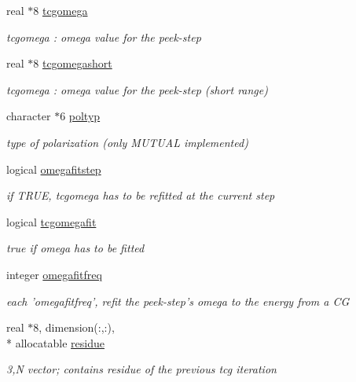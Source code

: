 \begin{DoxyCompactItemize}
real $\ast$8 \hyperlink{classpolpot_a2fe3943424bc94f38076ba1856914a0b}{tcgomega}
\begin{DoxyCompactList}\small\item\em tcgomega \-: omega value for the peek-\/step \end{DoxyCompactList}\item 
real $\ast$8 \hyperlink{classpolpot_a459f9e1fbebf2abc6e657cf1db12669e}{tcgomegashort}
\begin{DoxyCompactList}\small\item\em tcgomega \-: omega value for the peek-\/step (short range) \end{DoxyCompactList}\item 
character $\ast$6 \hyperlink{classpolpot_a06e16babc1553350168df1b66dcc2f3e}{poltyp}
\begin{DoxyCompactList}\small\item\em type of polarization (only M\-U\-T\-U\-A\-L implemented) \end{DoxyCompactList}\item 
logical \hyperlink{classpolpot_ae78e1a279ab2c444684065b7ee886d27}{omegafitstep}
\begin{DoxyCompactList}\small\item\em if T\-R\-U\-E, tcgomega has to be refitted at the current step \end{DoxyCompactList}\item 
logical \hyperlink{classpolpot_afd293680c0d460cc93c98b0440c8996b}{tcgomegafit}
\begin{DoxyCompactList}\small\item\em true if omega has to be fitted \end{DoxyCompactList}\item 
integer \hyperlink{classpolpot_a4aaa630ebb2190fb76d5dca094d15472}{omegafitfreq}
\begin{DoxyCompactList}\small\item\em each 'omegafitfreq', refit the peek-\/step's omega to the energy from a C\-G \end{DoxyCompactList}\item 
real $\ast$8, dimension(\-:,\-:), \\*
allocatable \hyperlink{classpolpot_a370c16f371afeaa70933a018b220beb4}{residue}
\begin{DoxyCompactList}\small\item\em 3,N vector; contains residue of the previous tcg iteration \end{DoxyCompactList}\item 

\end{DoxyCompactItemize}
